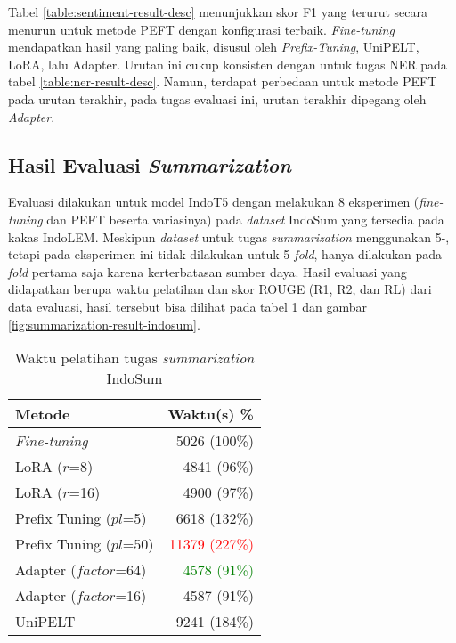 Tabel \ref{table:sentiment-result-desc} menunjukkan skor F1 yang terurut secara menurun untuk metode PEFT dengan konfigurasi terbaik. \textit{Fine-tuning} mendapatkan hasil yang paling baik, disusul oleh \textit{Prefix-Tuning}, UniPELT, LoRA, lalu Adapter. Urutan ini cukup konsisten dengan untuk tugas NER pada tabel \ref{table:ner-result-desc}. Namun, terdapat perbedaan untuk metode PEFT pada urutan terakhir, pada tugas evaluasi ini, urutan terakhir dipegang oleh \textit{Adapter}.

\subsection{Hasil Evaluasi \textit{Summarization}}

Evaluasi dilakukan untuk model IndoT5 dengan melakukan 8 eksperimen (\textit{fine-tuning} dan PEFT beserta variasinya) pada \textit{dataset} IndoSum yang tersedia pada kakas IndoLEM. Meskipun \textit{dataset} untuk tugas \textit{summarization} menggunakan 5-, tetapi pada eksperimen ini tidak dilakukan untuk 5\textit{-fold}, hanya dilakukan pada \textit{fold} pertama saja karena kerterbatasan sumber daya. Hasil evaluasi yang didapatkan berupa waktu pelatihan dan skor ROUGE (R1, R2, dan RL) dari data evaluasi, hasil tersebut bisa dilihat pada tabel \ref{table:runtime-summarization-indosum} dan gambar \ref{fig:summarization-result-indosum}.

\begin{table}[h]
    \centering
    \caption{Waktu pelatihan tugas \textit{summarization} IndoSum}
    \label{table:runtime-summarization-indosum}
    \begin{tabular}{l|r}
        \toprule
        \textbf{Metode} & \textbf{Waktu(s) \%} \\
        \midrule
        \textit{Fine-tuning} & 5026 (100\%) \\
        LoRA ($r$=8) & 4841 (96\%) \\
        LoRA ($r$=16) & 4900 (97\%) \\
        Prefix Tuning ($pl$=5) & 6618 (132\%) \\
        Prefix Tuning ($pl$=50) & \textcolor{Red}{11379 (227\%)} \\
        Adapter ($factor$=64) & \textcolor{Green}{4578 (91\%)} \\
        Adapter ($factor$=16) & 4587 (91\%) \\
        UniPELT & 9241 (184\%) \\
        \bottomrule
    \end{tabular}
\end{table}

